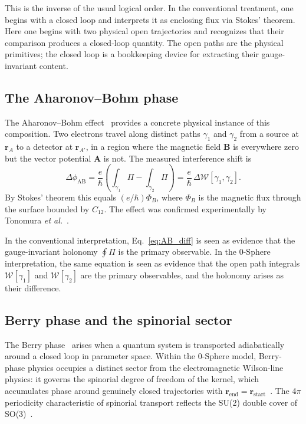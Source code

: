 \documentclass[%
 reprint, amsmath,amssymb, aps, prb, ]{revtex4-2}
\numberwithin{equation}{section}
\newcommand{\WL}{\mathcal{W}}
\begin{document}
This is the inverse of the usual logical order. In the conventional treatment, one begins with a closed loop and interprets it as enclosing flux via Stokes' theorem. Here one begins with two physical open trajectories and recognizes that their comparison produces a closed-loop quantity. The open paths are the physical primitives; the closed loop is a bookkeeping device for extracting their gauge-invariant content.

\subsection{The Aharonov--Bohm phase}

The Aharonov--Bohm effect~\cite{Aharonov1959} provides a concrete physical instance of this composition. Two electrons travel along distinct paths $\gamma_1$ and $\gamma_2$ from a source at $\mathbf{r}_A$ to a detector at $\mathbf{r}_{A'}$, in a region where the magnetic field $\mathbf{B}$ is everywhere zero but the vector potential $\mathbf{A}$ is not. The measured interference shift is
\begin{equation}
\Delta\phi_{\text{AB}} = \frac{e}{\hbar}\left(\int_{\gamma_1} \Pi - \int_{\gamma_2} \Pi\right) = \frac{e}{\hbar}\,\Delta\WL[\gamma_1, \gamma_2].
\label{eq:AB_diff}
\end{equation}
By Stokes' theorem this equals $(e/\hbar)\Phi_B$, where $\Phi_B$ is the magnetic flux through the surface bounded by $C_{12}$. The effect was confirmed experimentally by Tonomura \emph{et al.}~\cite{Tonomura1986}.

In the conventional interpretation, Eq.~\eqref{eq:AB_diff} is seen as evidence that the gauge-invariant holonomy $\oint \Pi$ is the primary observable. In the 0-Sphere interpretation, the same equation is seen as evidence that the open path integrals $\WL[\gamma_1]$ and $\WL[\gamma_2]$ are the primary observables, and the holonomy arises as their difference.

\subsection{Berry phase and the spinorial sector}

The Berry phase~\cite{Berry1984} arises when a quantum system is transported adiabatically around a closed loop in parameter space. Within the 0-Sphere model, Berry-phase physics occupies a distinct sector from the electromagnetic Wilson-line physics: it governs the spinorial degree of freedom of the kernel, which accumulates phase around genuinely closed trajectories with $\mathbf{r}_{\text{end}} = \mathbf{r}_{\text{start}}$~\cite{hanamura26, hanamura29}. The 4$\pi$ periodicity characteristic of spinorial transport reflects the SU(2) double cover of SO(3)~\cite{hanamura45}.
\end{document}
